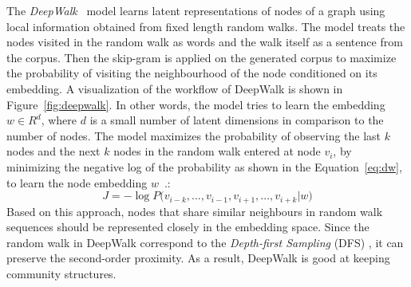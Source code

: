 The \emph{DeepWalk}~ model learns latent representations of nodes of a graph using local information obtained from fixed length random walks. The model treats the nodes visited in the random walk as words and the walk itself as  a sentence from the corpus. Then the skip-gram is applied on the generated corpus to maximize the probability of visiting the neighbourhood of the node conditioned on its embedding. A visualization of the workflow of DeepWalk is shown in Figure~\ref{fig:deepwalk}. In other words, the model tries to learn the embedding $w\in R^{ d} $, where $d$ is a small number of latent dimensions in comparison to the number of nodes. The model maximizes the probability of observing the last $k$ nodes and the next $k$ nodes in the random walk entered at node $v_{i}$, by minimizing the negative log of the probability as shown in the Equation~\ref{eq:dw}, to learn the node embedding $w$~.: 
\begin{equation}
J=-\log { P( } v_{ { i−k } },...,v_{ i−1 },v_{ i+1 },...,v_{ i+k }|w )
\label{eq:dw}
\end{equation}
Based on this approach, nodes that share similar neighbours in random walk sequences should be represented closely in the embedding space. Since the random walk in DeepWalk correspond to the \emph{Depth-first Sampling} (DFS) , it can preserve the second-order proximity. As a result, DeepWalk is good at keeping community structures. 
